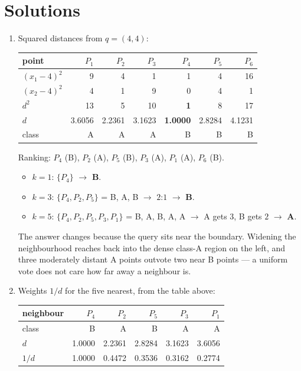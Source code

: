 \documentclass[11pt]{article}
\begin{document}
\section{Solutions}
\label{sec:solutions}

\begin{enumerate}[leftmargin=*, itemsep=0.7em]

\item Squared distances from $q = (4,4)$:

  \begin{center}\small
  \begin{tabular}{@{}lrrrrrr@{}}
  \toprule
  point & $P_1$ & $P_2$ & $P_3$ & $P_4$ & $P_5$ & $P_6$\\
  \midrule
  $(x_1-4)^2$ & 9 & 4 & 1 & 1 & 4 & 16\\
  $(x_2-4)^2$ & 4 & 1 & 9 & 0 & 4 & 1\\
  \midrule
  $d^2$ & 13 & 5 & 10 & \textbf{1} & 8 & 17\\
  $d$ & 3.6056 & 2.2361 & 3.1623 & \textbf{1.0000} & 2.8284 & 4.1231\\
  class & A & A & A & B & B & B\\
  \bottomrule
  \end{tabular}
  \end{center}

  Ranking: $P_4$ (B), $P_2$ (A), $P_5$ (B), $P_3$ (A), $P_1$ (A), $P_6$ (B).

  \begin{itemize}
    \item $k=1$: $\{P_4\}$ $\to$ \textbf{B}.
    \item $k=3$: $\{P_4, P_2, P_5\}$ = B, A, B $\to$ $2$:$1$ $\to$ \textbf{B}.
    \item $k=5$: $\{P_4, P_2, P_5, P_3, P_1\}$ = B, A, B, A, A $\to$ A gets
      $3$, B gets $2$ $\to$ \textbf{A}.
  \end{itemize}

  The answer changes because the query sits near the boundary. Widening the
  neighbourhood reaches back into the dense class-A region on the left, and
  three moderately distant A points outvote two near B points --- a uniform
  vote does not care how far away a neighbour is.

\item Weights $1/d$ for the five nearest, from the table above:

  \begin{center}\small
  \begin{tabular}{@{}lrrrrr@{}}
  \toprule
  neighbour & $P_4$ & $P_2$ & $P_5$ & $P_3$ & $P_1$\\
  \midrule
  class & B & A & B & A & A\\
  $d$ & 1.0000 & 2.2361 & 2.8284 & 3.1623 & 3.6056\\
  $1/d$ & 1.0000 & 0.4472 & 0.3536 & 0.3162 & 0.2774\\
  \bottomrule
  \end{tabular}
  \end{center}


\end{enumerate}
\end{document}
